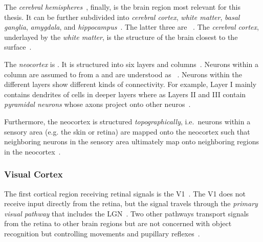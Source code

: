 The \textit{cerebral hemispheres}~\citep[p. 341]{mack2013principles}, finally, is the brain region most relevant for this thesis.
It can be further subdivided into \textit{cerebral cortex}, \textit{white matter}, \textit{basal ganglia}, \textit{amygdala}, and \textit{hippocampus}~\citep[p. 341]{mack2013principles}.
The latter three are ~\citep[p. 342]{mack2013principles}.
The \textit{cerebral cortex}, underlayed by the \textit{white matter}, is the structure of the brain closest to the surface~\citet[p. 341]{mack2013principles}.

The \textit{neocortex} is  \citet[p. 345]{mack2013principles}.
It is structured into six layers and columns~\citep[p. 345]{mack2013principles}.
Neurons within a column are assumed to from a  and are understood as ~\citep[p. 348]{mack2013principles}.
Neurons within the different layers show different kinds of connectivity.
For example, Layer I mainly contains dendrites of cells in deeper layers where as Layers II and III contain \textit{pyramidal neurons} whose axons project onto other neuros~\citep[p. 346]{mack2013principles}.

Furthermore, the neocortex is structured \textit{topographically}, i.e.~neurons within a sensory area (e.g. the skin or retina) are mapped onto the neocortex such that neighboring neurons in the sensory area ultimately map onto neighboring regions in the neocortex~\citep[p. 343]{mack2013principles}.

\subsubsection{Visual Cortex}\label{subsubsec:visual-cortex}

The first cortical region receiving retinal signals is the \acf{V1}~\citep[p. 559]{mack2013principles}.
The \ac{V1} does not receive input directly from the retina, but the signal travels through the \textit{primary visual pathway} that includes the \ac{LGN}~\citep[p. 559]{mack2013principles}.
Two other pathways transport signals from the retina to other brain regions but are not concerned with object recognition but controlling movements and pupillary reflexes~\citep[p. 559]{mack2013principles}.

